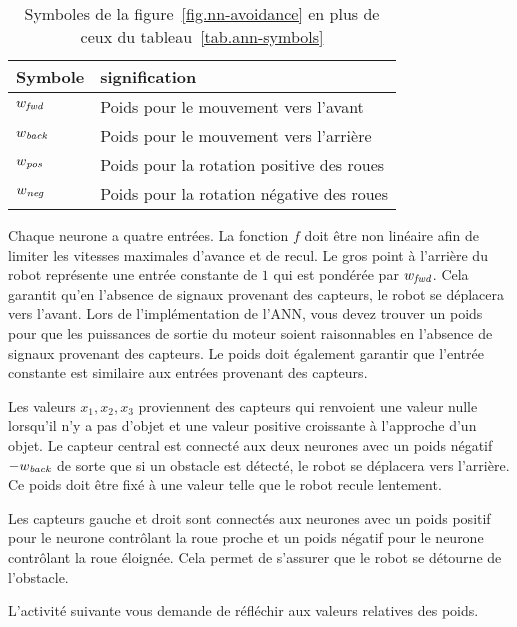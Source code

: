 \begin{table}
\caption{Symboles de la figure~\ref{fig.nn-avoidance} en plus de ceux du tableau~\ref{tab.ann-symbols}}
\label{tab.obstacle-avoidance}
\begin{center}
\begin{tabular}{p{2cm}p{6cm}}
\hline
Symbole & signification\\
\hline
$w_{\textit{\scriptsize fwd}}$ & Poids pour le mouvement vers l'avant\\
$w_{\textit{\scriptsize back}}$ & Poids pour le mouvement vers l'arrière\\
$w_{\textit{\scriptsize pos}}$ & Poids pour la rotation positive des roues\\
$w_{\textit{\scriptsize neg}}$ & Poids pour la rotation négative des roues\\
\hline
\end{tabular}
\end{center}
\end{table}

Chaque neurone a quatre entrées. La fonction $f$ doit être non linéaire afin de limiter les vitesses maximales d'avance et de recul. Le gros point à l'arrière du robot représente une entrée constante de $1$ qui est pondérée par $w_{\textit{\scriptsize fwd}}$. Cela garantit qu'en l'absence de signaux provenant des capteurs, le robot se déplacera vers l'avant. Lors de l'implémentation de l'ANN, vous devez trouver un poids pour que les puissances de sortie du moteur soient raisonnables en l'absence de signaux provenant des capteurs. Le poids doit également garantir que l'entrée constante est similaire aux entrées provenant des capteurs.

Les valeurs $x_1, x_2, x_3$ proviennent des capteurs qui renvoient une valeur nulle lorsqu'il n'y a pas d'objet et une valeur positive croissante à l'approche d'un objet. Le capteur central est connecté aux deux neurones avec un poids négatif $-w_{\textit{\scriptsize back}}$ de sorte que si un obstacle est détecté, le robot se déplacera vers l'arrière. Ce poids doit être fixé à une valeur telle que le robot recule lentement.

Les capteurs gauche et droit sont connectés aux neurones avec un poids positif pour le neurone contrôlant la roue proche et un poids négatif pour le neurone contrôlant la roue éloignée. Cela permet de s'assurer que le robot se détourne de l'obstacle.

L'activité suivante vous demande de réfléchir aux valeurs relatives des poids.

